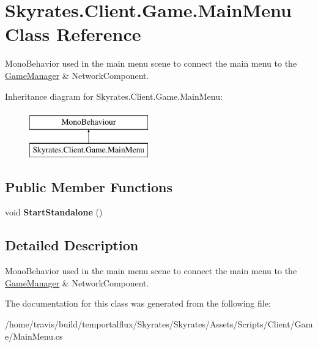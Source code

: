 \hypertarget{class_skyrates_1_1_client_1_1_game_1_1_main_menu}{\section{Skyrates.\-Client.\-Game.\-Main\-Menu Class Reference}
\label{class_skyrates_1_1_client_1_1_game_1_1_main_menu}
}


Mono\-Behavior used in the main menu scene to connect the main menu to the \hyperlink{class_skyrates_1_1_client_1_1_game_1_1_game_manager}{Game\-Manager} \& Network\-Component.  


Inheritance diagram for Skyrates.\-Client.\-Game.\-Main\-Menu\-:\begin{figure}[H]
\begin{center}
\leavevmode
\includegraphics[height=2.000000cm]{class_skyrates_1_1_client_1_1_game_1_1_main_menu}
\end{center}
\end{figure}
\subsection*{Public Member Functions}
\begin{DoxyCompactItemize}
\item 
\hypertarget{class_skyrates_1_1_client_1_1_game_1_1_main_menu_ad532a5e2ae90e677eb3eb99974c45d11}{void {\bfseries Start\-Standalone} ()}\label{class_skyrates_1_1_client_1_1_game_1_1_main_menu_ad532a5e2ae90e677eb3eb99974c45d11}

\end{DoxyCompactItemize}


\subsection{Detailed Description}
Mono\-Behavior used in the main menu scene to connect the main menu to the \hyperlink{class_skyrates_1_1_client_1_1_game_1_1_game_manager}{Game\-Manager} \& Network\-Component. 



The documentation for this class was generated from the following file\-:\begin{DoxyCompactItemize}
\item 
/home/travis/build/temportalflux/\-Skyrates/\-Skyrates/\-Assets/\-Scripts/\-Client/\-Game/Main\-Menu.\-cs\end{DoxyCompactItemize}
